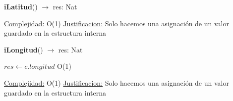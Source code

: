 \begin{Algoritmos}
\begin{algorithm}[H]{\textbf{iLatitud}() $\to$ res: Nat}
\begin{algorithmic}[1]
		\medskip
		\Statex \underline{Complejidad:} O(1)
			\Statex \underline{Justificacion:} Solo hacemos una asignaci\'on de un valor guardado en la estructura interna
	\end{algorithmic}
\end{algorithm}


\begin{algorithm}[H]{\textbf{iLongitud}() $\to$ res: Nat}
	\begin{algorithmic}[1]
		\State $res \gets c.longitud$ \Comment O(1)
		
		\medskip
		\Statex \underline{Complejidad:} O(1)
			\Statex \underline{Justificacion:} Solo hacemos una asignaci\'on de un valor guardado en la estructura interna
	\end{algorithmic}
\end{algorithm}

\end{Algoritmos}
